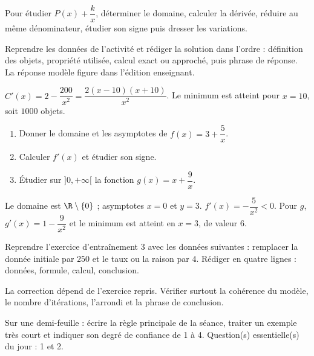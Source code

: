 \begin{summary}Pour étudier $P(x)+\dfrac{k}{x}$, déterminer le domaine, calculer la dérivée, réduire au même dénominateur, étudier son signe puis dresser les variations.\end{summary}

\begin{example}
Reprendre les données de l'activité et rédiger la solution dans l'ordre : définition des objets, propriété utilisée, calcul exact ou approché, puis phrase de réponse. La réponse modèle figure dans l'édition enseignant.
\end{example}
\begin{solution}$C'(x)=2-\dfrac{200}{x^2}=\dfrac{2(x-10)(x+10)}{x^2}$. Le minimum est atteint pour $x=10$, soit $\num{1000}$ objets.\end{solution}

\begin{exercise}[essentiel]
\begin{enumerate}\item Donner le domaine et les asymptotes de $f(x)=3+\dfrac{5}x$.\item Calculer $f'(x)$ et étudier son signe.\item Étudier sur $]0,+\infty[$ la fonction $g(x)=x+\dfrac{9}x$.\end{enumerate}
\end{exercise}
\begin{solution}Le domaine est $\R\setminus\{0\}$ ; asymptotes $x=0$ et $y=3$. $f'(x)=-\dfrac{5}{x^2}<0$. Pour $g$, $g'(x)=1-\dfrac{9}{x^2}$ et le minimum est atteint en $x=3$, de valeur $6$.\end{solution}


\begin{homework}Reprendre l'exercice d'entraînement 3 avec les données suivantes : remplacer la donnée initiale par $250$ et le taux ou la raison par $4$. Rédiger en quatre lignes : données, formule, calcul, conclusion.\end{homework}
\begin{solution}La correction dépend de l'exercice repris. Vérifier surtout la cohérence du modèle, le nombre d'itérations, l'arrondi et la phrase de conclusion.\end{solution}

\begin{exitticket}[3 minutes]Sur une demi-feuille : écrire la règle principale de la séance, traiter un exemple très court et indiquer son degré de confiance de 1 à 4. Question(s) essentielle(s) du jour : 1 et 2.\end{exitticket}

